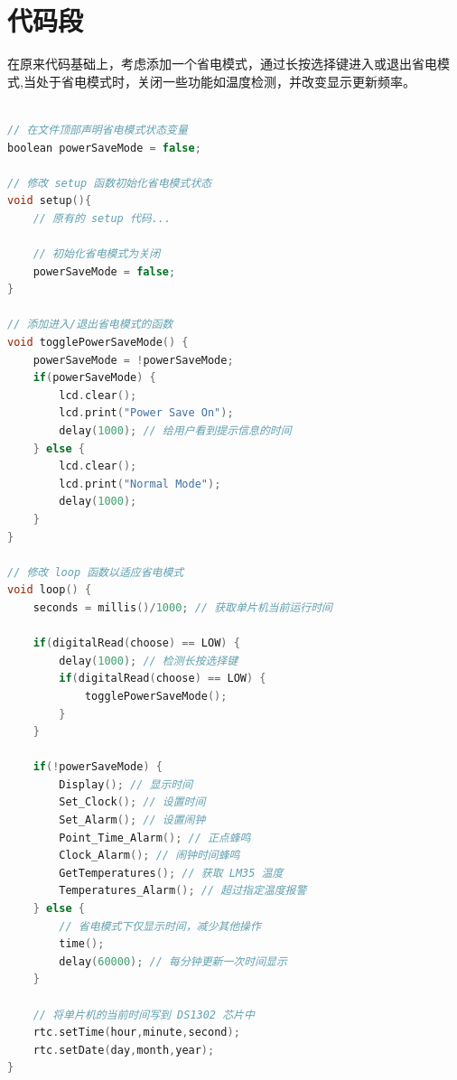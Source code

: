 \documentclass[10.5pt]{config}
\begin{document}
\section{代码段}
在原来代码基础上，考虑添加一个省电模式，通过长按选择键进入或退出省电模式,当处于省电模式时，关闭一些功能如温度检测，并改变显示更新频率。
\begin{lstlisting}[language=C++, caption=Arduino数字时钟新增代码]

// 在文件顶部声明省电模式状态变量
boolean powerSaveMode = false;

// 修改 setup 函数初始化省电模式状态
void setup(){ 
    // 原有的 setup 代码...

    // 初始化省电模式为关闭
    powerSaveMode = false;
}

// 添加进入/退出省电模式的函数
void togglePowerSaveMode() {
    powerSaveMode = !powerSaveMode;
    if(powerSaveMode) {
        lcd.clear();
        lcd.print("Power Save On");
        delay(1000); // 给用户看到提示信息的时间
    } else {
        lcd.clear();
        lcd.print("Normal Mode");
        delay(1000);
    }
}

// 修改 loop 函数以适应省电模式
void loop() { 
    seconds = millis()/1000; // 获取单片机当前运行时间
    
    if(digitalRead(choose) == LOW) {
        delay(1000); // 检测长按选择键
        if(digitalRead(choose) == LOW) {
            togglePowerSaveMode();
        }
    }

    if(!powerSaveMode) {
        Display(); // 显示时间
        Set_Clock(); // 设置时间
        Set_Alarm(); // 设置闹钟
        Point_Time_Alarm(); // 正点蜂鸣
        Clock_Alarm(); // 闹钟时间蜂鸣
        GetTemperatures(); // 获取 LM35 温度
        Temperatures_Alarm(); // 超过指定温度报警
    } else {
        // 省电模式下仅显示时间，减少其他操作
        time();
        delay(60000); // 每分钟更新一次时间显示
    }

    // 将单片机的当前时间写到 DS1302 芯片中
    rtc.setTime(hour,minute,second);
    rtc.setDate(day,month,year);
}
\end{lstlisting}
\end{document}
